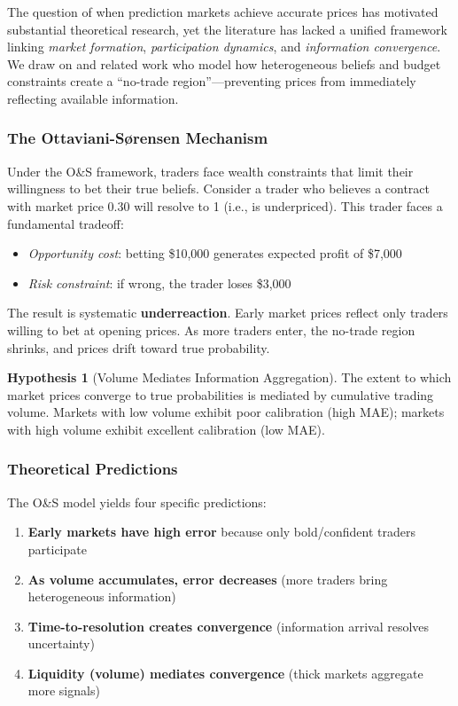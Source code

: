 \documentclass[a4paper,11pt]{article}
\theoremstyle{plain}
\theoremstyle{definition}
\newtheorem{hypothesis}[theorem]{Hypothesis}
\theoremstyle{remark}
\newcommand{\citet}[1]{\textcite{#1}}
\begin{document}
The question of when prediction markets achieve accurate prices has motivated substantial theoretical research, yet the literature has lacked a unified framework linking \textit{market formation}, \textit{participation dynamics}, and \textit{information convergence}. We draw on \citet{Ottaviani2007} and related work who model how heterogeneous beliefs and budget constraints create a ``no-trade region''---preventing prices from immediately reflecting available information.

\subsubsection{The Ottaviani-Sørensen Mechanism}

Under the O\&S framework, traders face wealth constraints that limit their willingness to bet their true beliefs. Consider a trader who believes a contract with market price 0.30 will resolve to 1 (i.e., is underpriced). This trader faces a fundamental tradeoff:

\begin{itemize}
    \item \textit{Opportunity cost}: betting \$10,000 generates expected profit of \$7,000
    \item \textit{Risk constraint}: if wrong, the trader loses \$3,000
\end{itemize}

The result is systematic \textbf{underreaction}. Early market prices reflect only traders willing to bet at opening prices. As more traders enter, the no-trade region shrinks, and prices drift toward true probability.

\begin{hypothesis}[Volume Mediates Information Aggregation]
\label{hyp:main}
The extent to which market prices converge to true probabilities is mediated by cumulative trading volume. Markets with low volume exhibit poor calibration (high MAE); markets with high volume exhibit excellent calibration (low MAE).
\end{hypothesis}

\subsubsection{Theoretical Predictions}

The O\&S model yields four specific predictions:

\begin{enumerate}
    \item \textbf{Early markets have high error} because only bold/confident traders participate
    \item \textbf{As volume accumulates, error decreases} (more traders bring heterogeneous information)
    \item \textbf{Time-to-resolution creates convergence} (information arrival resolves uncertainty)
    \item \textbf{Liquidity (volume) mediates convergence} (thick markets aggregate more signals)
\end{enumerate}
\end{document}
